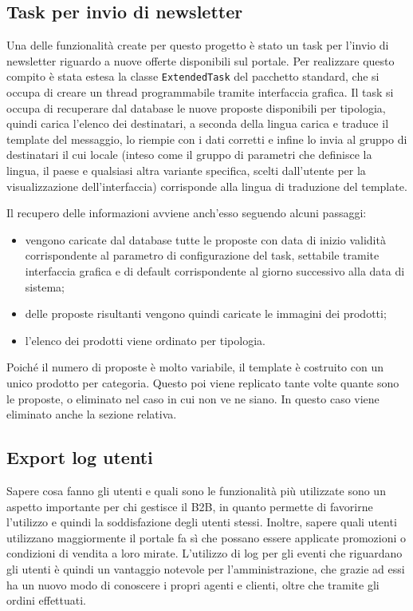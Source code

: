 \subsection{Task per invio di newsletter}
Una delle funzionalità create per questo progetto è stato un task per l'invio di newsletter riguardo a nuove offerte disponibili sul portale. Per realizzare questo compito è stata estesa la classe \texttt{ExtendedTask} del pacchetto standard, che si occupa di creare un thread programmabile tramite interfaccia grafica. Il task si occupa di recuperare dal database le nuove proposte disponibili per tipologia, quindi carica l'elenco dei destinatari, a seconda della lingua carica e traduce il template del messaggio, lo riempie con i dati corretti e infine lo invia al gruppo di destinatari il cui locale (inteso come il gruppo di parametri che definisce la lingua, il paese e qualsiasi altra variante specifica, scelti dall'utente per la visualizzazione dell'interfaccia) corrisponde alla lingua di traduzione del template.

Il recupero delle informazioni avviene anch'esso seguendo alcuni passaggi:
\begin{itemize}
	\item vengono caricate dal database tutte le proposte con data di inizio validità corrispondente al parametro di configurazione del task, settabile tramite interfaccia grafica e di default corrispondente al giorno successivo alla data di sistema;
	\item delle proposte risultanti vengono quindi caricate le immagini dei prodotti;
	\item l'elenco dei prodotti viene ordinato per tipologia.
\end{itemize}
Poiché il numero di proposte è molto variabile, il template è costruito con un unico prodotto per categoria. Questo poi viene replicato tante volte quante sono le proposte, o eliminato nel caso in cui non ve ne siano. In questo caso viene eliminato anche la sezione relativa.


\subsection{Export log utenti}
Sapere cosa fanno gli utenti e quali sono le funzionalità più utilizzate sono un aspetto importante per chi gestisce il B2B, in quanto permette di favorirne l'utilizzo e quindi la soddisfazione degli utenti stessi. Inoltre, sapere quali utenti utilizzano maggiormente il portale fa sì che possano essere applicate promozioni o condizioni di vendita a loro mirate. L'utilizzo di log per gli eventi che riguardano gli utenti è quindi un vantaggio notevole per l'amministrazione, che grazie ad essi ha un nuovo modo di conoscere i propri agenti e clienti, oltre che tramite gli ordini effettuati.

